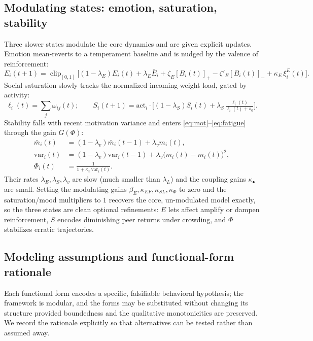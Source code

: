 \documentclass[11pt]{article}
\newcommand{\clip}{\operatorname{clip}_{[0,1]}}
\begin{document}
\subsection{Modulating states: emotion, saturation, stability}\label{sec:modulating}
Three slower states modulate the core dynamics and are given explicit updates. Emotion mean-reverts to a temperament baseline and is nudged by the valence of reinforcement:
\begin{equation}\tag{E}\label{eq:emotion}
E_i(t{+}1)=\clip\!\Big[(1-\lambda_E)E_i(t)+\lambda_E\bar E_i+\zeta_E[B_i(t)]_+-\zeta'_E[B_i(t)]_-+\kappa_E\,\xi^E_i(t)\Big].
\end{equation}
Social saturation slowly tracks the normalized incoming-weight load, gated by activity:
\begin{equation}\tag{S}\label{eq:saturation}
\ell_i(t)=\sum_j\omega_{ij}(t);\qquad S_i(t{+}1)=\mathrm{act}_i\cdot\Big[(1-\lambda_S)S_i(t)+\lambda_S\,\tfrac{\ell_i(t)}{\ell_i(t)+s_0}\Big].
\end{equation}
Stability falls with recent motivation variance and enters \eqref{eq:mot}--\eqref{eq:fatigue} through the gain $G(\Phi)$:
\begin{equation}\tag{$\Phi$}\label{eq:stability}
\begin{aligned}
\bar m_i(t)&=(1-\lambda_v)\bar m_i(t{-}1)+\lambda_v m_i(t),\\
\mathrm{var}_i(t)&=(1-\lambda_v)\mathrm{var}_i(t{-}1)+\lambda_v\big(m_i(t)-\bar m_i(t)\big)^2,\\
\Phi_i(t)&=\frac{1}{1+\kappa_v\,\mathrm{var}_i(t)}.
\end{aligned}
\end{equation}
Their rates $\lambda_E,\lambda_S,\lambda_v$ are slow (much smaller than $\lambda_L$) and the coupling gains $\kappa_\bullet$ are small. Setting the modulating gains $\beta_E,\kappa_{EF},\kappa_{SL},\kappa_\Phi$ to zero and the saturation/mood multipliers to $1$ recovers the core, un-modulated model exactly, so the three states are clean optional refinements: $E$ lets affect amplify or dampen reinforcement, $S$ encodes diminishing peer returns under crowding, and $\Phi$ stabilizes erratic trajectories.

\subsection{Modeling assumptions and functional-form rationale}\label{sec:assumptions}
Each functional form encodes a specific, falsifiable behavioral hypothesis; the framework is modular, and the forms may be substituted without changing its structure provided boundedness and the qualitative monotonicities are preserved. We record the rationale explicitly so that alternatives can be tested rather than assumed away.
\end{document}
